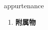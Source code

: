 
\begin{frame}
{\huge appurtenance}
\begin{center}
\begin{enumerate}\Large
  \item \textbf{附属物}
\end{enumerate}
\end{center}
\end{frame}
